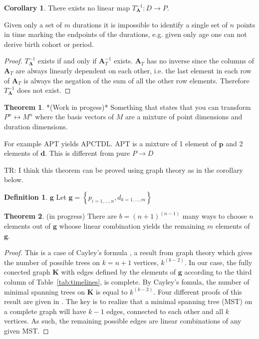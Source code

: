 \documentclass[12pt,oneside,a4paper]{article} %
\theoremstyle{definition}
\newtheorem{definition}{Definition}[section]
\newtheorem{theorem}{Theorem}[section]
\newtheorem{corollary}{Corollary}[theorem]
\newcommand\vt[1]{\textcolor{rd}{#1}}
\begin{document}
\begin{appendices}
\begin{corollary} There exists no linear map $T_\textbf{A}^{-1}: D \rightarrow
P$.
\end{corollary}

Given only a set of $m$ durations it is impossible to identify a single set of
$n$ points in time marking the endpoints of the durations, e.g. given only age one can not derive birth cohort or period.

\begin{proof} $T_\textbf{A}^{-1}$ exists if and only if $\textbf{A}_T^{-1}$ exists. $\textbf{A}_T$ has no inverse since the columns of $\textbf{A}_T$ are always linearly dependent on each other, i.e. the last element in each row of $\textbf{A}_T$ is always the negation of the sum of all the other row elements. Therefore $T_\textbf{A}^{-1}$ does not exist.
\end{proof}

\begin{theorem}
\label{mixing} *(Work in progess)* Something that states that you can transform
 $P^n \leftrightarrow M^n$ where the basis vectors of $M$ are a mixture of point dimensions and duration dimensions.
\end{theorem}
\vt{For example APT yields APCTDL. APT is a mixture of 1 element of
$\textbf{p}$ and 2 elements of $\textbf{d}$. This is different from pure
$P\rightarrow D$}

\vt{TR: I think this theorem can be proved using graph theory as in the
corollary below.}


\begin{definition}{$\textbf{g}$}
Let $\textbf{g} = \left\{p_{i=1,\ldots,n},
d_{k=1,\ldots,m}\right\}$
\end{definition}

\begin{theorem} (in progress) There are $b = (n+1)^{(n-1)}$ many
ways to choose $n$ elements out of $\textbf{g}$ whoose linear combination yields the
remaining $m$ elements of $\textbf{g}$.
\end{theorem}

\begin{proof}
This is a case of Cayley's formula \citep{cayley1889}, a result from
graph theory which gives the number of possible trees on $k = n+1$ vertices,
$k^{(k-2)}$. In our case, the fully conected graph $\textbf{K}$ with edges
defined by the elements of $\textbf{g}$ according to the third column of
Table~\ref{tab:timelines}, is complete. By Cayley's fomula, the number of
minimal spanning trees on $\textbf{K}$ is equal to $k^{(k-2)}$. Four different proofs of
this result are given in \citet{aigner2010proofs}. The key is to realize that a
minimal spanning tree (MST) on a complete graph will have $k-1$ edges, connected
to each other and all $k$ vertices. As such, the remaining possible edges are
linear combinations of any given MST.
\end{proof}


\end{appendices}
\end{document}
